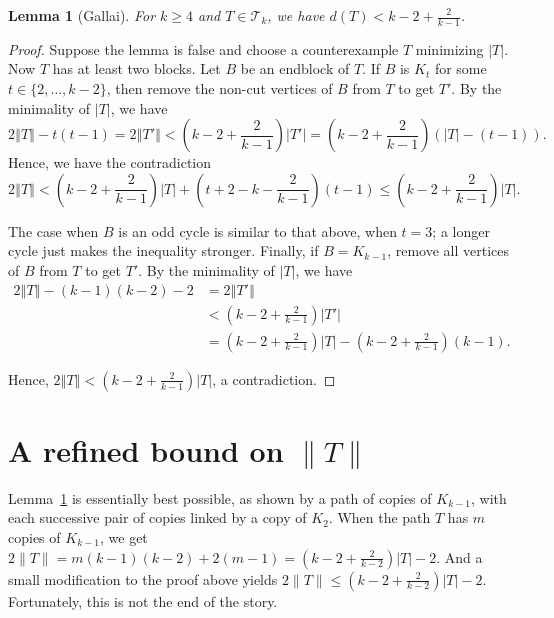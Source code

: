 \documentclass[12pt]{article}
\theoremstyle{plain}
\newtheorem{lem}[thm]{Lemma}
\theoremstyle{definition}
\theoremstyle{remark}
\newcommand{\fancy}[1]{\mathcal{#1}}
\newcommand{\T}{\fancy{T}}
\newcommand{\size}[1]{\left\Vert#1\right\Vert}
\newcommand{\parens}[1]{\left( #1 \right)}
\begin{document}
\begin{lem}[Gallai]
\label{BasicGallaiTreeBound}
	For $k \ge 4$ and $T \in \T_k$, we have $d(T) < k-2 + \frac{2}{k-1}$.
\end{lem}
\begin{proof}
	Suppose the lemma is false and choose a counterexample $T$ minimizing
$|T|$.  Now $T$ has at least two blocks.  Let $B$ be an endblock of $T$.  If $B$
is $K_t$ for some $t\in \{2,\ldots, k-2\}$, then remove the non-cut vertices of
$B$ from $T$ to get $T'$.  By the minimality of $|T|$, we have 
	\[2\size{T} - t(t-1) = 2\size{T'} < \parens{k-2 + \frac{2}{k-1}}|T'| = \parens{k-2 + \frac{2}{k-1}}\parens{|T|-(t-1)}.\]
	Hence, we have the contradiction
	\[2\size{T} < \parens{k-2 + \frac{2}{k-1}}|T| + (t+2 -k - \frac{2}{k-1})(t-1) \le \parens{k-2 + \frac{2}{k-1}}|T|.\]
	
	The case when $B$ is an odd cycle is similar to that above, when $t=3$; a
longer cycle just makes the inequality stronger.  Finally, if $B = K_{k-1}$,
remove all vertices of $B$ from $T$ to get $T'$. By the minimality of $|T|$, we have 
	\begin{align*}
	  2\size{T} - (k-1)(k-2) - 2 &= 2\size{T'}\\
	  &< \parens{k-2 + \frac{2}{k-1}}|T'|\\
	  &= \parens{k-2 + \frac{2}{k-1}}|T| - \parens{k-2 + \frac{2}{k-1}}(k-1).
	\end{align*}

	Hence, $2\size{T} < \parens{k-2 + \frac{2}{k-1}}|T|$, a contradiction.
\end{proof}

\section{A refined bound on \texorpdfstring{$\|T\|$}{\|T\|}}
Lemma~\ref{BasicGallaiTreeBound} is essentially best possible, as shown by a
path of copies of $K_{k-1}$, with each successive pair of copies linked by a
copy of $K_2$.  When the path $T$ has $m$ copies of $K_{k-1}$, we get
$2\|T\|=m(k-1)(k-2)+2(m-1) = (k-2+\frac2{k-2})|T|-2$.  And a small modification
to the proof above yields $2\|T\| \le (k-2+\frac2{k-2})|T|-2$. 
Fortunately, this is not the end of the story.
\end{document}
